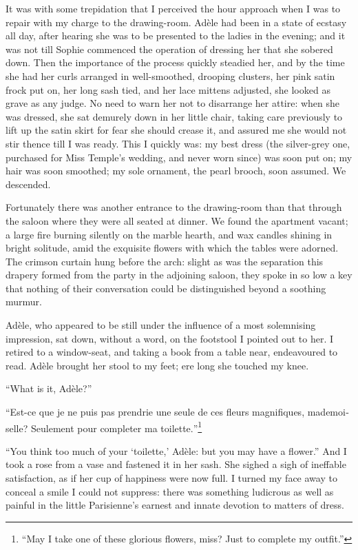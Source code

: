 It was with some trepidation that I perceived the hour approach when I
was to repair with my charge to the drawing-room. Adèle had been in a
state of ecstasy all day, after hearing she was to be presented to the
ladies in the evening; and it was not till Sophie commenced the
operation of dressing her that she sobered down. Then the importance of
the process quickly steadied her, and by the time she had her curls
arranged in well-smoothed, drooping clusters, her pink satin frock put
on, her long sash tied, and her lace mittens adjusted, she looked as
grave as any judge. No need to warn her not to disarrange her attire:
when she was dressed, she sat demurely down in her little chair, taking
care previously to lift up the satin skirt for fear she should crease
it, and assured me she would not stir thence till I was ready. This I
quickly was: my best dress (the silver-grey one, purchased for Miss
Temple's wedding, and never worn since) was soon put on; my hair was
soon smoothed; my sole ornament, the pearl brooch, soon assumed. We
descended.

Fortunately there was another entrance to the drawing-room than that
through the saloon where they were all seated at dinner. We found the
apartment vacant; a large fire burning silently on the marble hearth,
and wax candles shining in bright solitude, amid the exquisite flowers
with which the tables were adorned. The crimson curtain hung before the
arch: slight as was the separation this drapery formed from the party in
the adjoining saloon, they spoke in so low a key that nothing of their
conversation could be distinguished beyond a soothing murmur.

Adèle, who appeared to be still under the influence of a most
solemnising impression, sat down, without a word, on the footstool I
pointed out to her. I retired to a window-seat, and taking a book from
a table near, endeavoured to read. Adèle brought her stool to my feet;
ere long she touched my knee.

\enquote{What is it, Adèle?}

\foreignquote{french}{Est-ce que je ne puis pas prendrie une seule de ces fleurs
magnifiques, mademoiselle? Seulement pour completer ma toilette.}\footnote{
\enquote{May I take one of these glorious flowers, miss? Just to complete my outfit.}}

\enquote{You think too much of your \foreignquote{french}{toilette,} Adèle: but you
may have a flower.} And I took a rose from a vase and fastened it in
her sash. She sighed a sigh of ineffable satisfaction, as if her cup of
happiness were now full. I turned my face away to conceal a smile I
could not suppress: there was something ludicrous as well as painful in
the little Parisienne's earnest and innate devotion to matters of dress.

